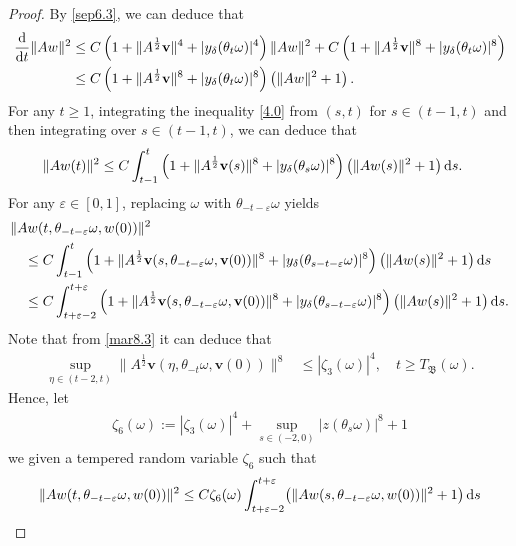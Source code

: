 \documentclass{elsarticle}
\theoremstyle{definition}
\numberwithin{equation}{section}
\renewcommand{\d}{{\rm{d}}}
\begin{document}
\begin{proof}
By \eqref{sep6.3}, we can deduce that
\begin{align}\label{4.0}
 \frac{\d}{\d t}\|Aw\|^2  &\leq C\left (1+\|A^\frac12 \textbf{v}\|^4 +|y_\delta(\theta_t\omega)|^4 \right )
\|Aw\|^2
+C \left (1+\|A^\frac12 \textbf{v}\|^8 +|y_\delta(\theta_t\omega)|^8 \right)\nonumber\\
&\leq     C\left (1+\|A^\frac12 \textbf{v}\|^8 +|y_\delta(\theta_t\omega)|^8 \right )\left( \|Aw\|^2+1\right)   .
\end{align}
For any $t \geq 1$, integrating the  inequality \eqref{4.0} from $(s,t)$ for $s\in (t-1,t)$  and then integrating over $s\in (t-1,t)$,  we can deduce that
\begin{align*}
 \|Aw(t)\|^2
& \leq    C\int_{t-1}^t   \left (1 +\|A^\frac12\textbf{v}(s)\|^8+|y_\delta(\theta_s\omega)|^8 \right ) \left( \|Aw(s)\|^2 +1\right)\d s.
\end{align*}
For any $\varepsilon\in [0,1]$, replacing $\omega$ with $\theta_{-t-\varepsilon}\omega$ yields
\begin{align*}
& \|Aw(t,\theta_{-t-\varepsilon}\omega, w(0))\|^2   \\
&\quad  \leq   C  \int_{t-1}^t   \left (1 +\|A^\frac12\textbf{v}(s,\theta_{-t-\varepsilon}\omega, \textbf{v}(0))\|^8+|y_\delta(\theta_{s-t-\varepsilon}\omega)|^8 \right ) \left( \|Aw(s)\|^2 +1\right) \d s   \\
&\quad  \leq   C  \int_{t+\varepsilon-2}^{t+\varepsilon}   \left (1 +\|A^\frac12\textbf{v}(s,\theta_{-t-\varepsilon}\omega, \textbf{v}(0))\|^8+|y_\delta(\theta_{s-t-\varepsilon}\omega)|^8 \right ) \left( \|Aw(s)\|^2 +1\right) \d s .
\end{align*}
Note that from  \eqref{mar8.3}  it can deduce that
\begin{align*}
\sup_{\eta\in (t-2,t)}
 \|A^{\frac12}\textbf{v} (\eta ,\theta_{-t } \omega, \textbf{v}(0)) \|^8
&\leq  |\zeta_3(\omega)|^4 ,\quad t\geq T_{\mathfrak B} (\omega) .
\end{align*}
Hence,  let
\begin{align*}
 \zeta_6(\omega):=   |\zeta_3(\omega)|^4 +\sup_{s\in(-2,0)} |z(\theta_s\omega)|^8+1
\end{align*}
we    given a tempered random variable $\zeta_6$ such that
\begin{align*}
  \|Aw(t,\theta_{-t-\varepsilon}\omega, w(0))\|^2     \leq   C \zeta_6(\omega)  \int_{t+\varepsilon-2}^{t+\varepsilon}   \! \big( \|Aw(s,\theta_{-t-\varepsilon } \omega, w(0))\|^2 +1\big)\, \d s
\end{align*}

\end{proof}
\end{document}
